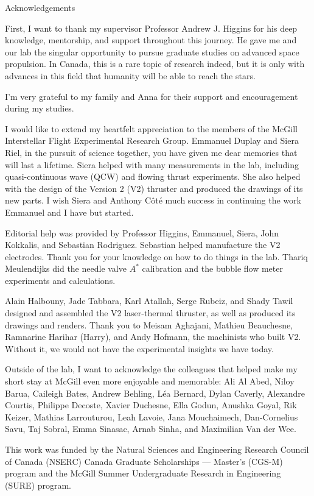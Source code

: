 \begin{plainchp}{Acknowledgements}
    
    First, I want to thank my supervisor Professor Andrew J. Higgins for his deep knowledge, mentorship, and support throughout this journey. He gave me and our lab the singular opportunity to pursue graduate studies on advanced space propulsion. In Canada, this is a rare topic of research indeed, but it is only with advances in this field that humanity will be able to reach the stars.

    I'm very grateful to my family and Anna for their support and encouragement during my studies.

    I would like to extend my heartfelt appreciation to the members of the McGill Interstellar Flight Experimental Research Group. Emmanuel Duplay and Siera Riel, in the pursuit of science together, you have given me dear memories that will last a lifetime. Siera helped with many measurements in the lab, including quasi-continuous wave (QCW) and flowing thrust experiments. She also helped with the design of the Version 2 (V2) thruster and produced the drawings of its new parts. I wish Siera and Anthony Côté much success in continuing the work Emmanuel and I have but started.

    Editorial help was provided by Professor Higgins, Emmanuel, Siera, John Kokkalis, and Sebastian Rodriguez. Sebastian helped manufacture the V2 electrodes. Thank you for your knowledge on how to do things in the lab. Thariq Meulendijks did the needle valve $A^*$ calibration and the bubble flow meter experiments and calculations.

    Alain Halbouny, Jade Tabbara, Karl Atallah, Serge Rubeiz, and Shady Tawil designed and assembled the V2 laser-thermal thruster, as well as produced its drawings and renders. Thank you to Meisam Aghajani, Mathieu Beauchesne, Ramnarine Harihar (Harry), and Andy Hofmann, the machinists who built V2. Without it, we would not have the experimental insights we have today.

    Outside of the lab, I want to acknowledge the colleagues that helped make my short stay at McGill even more enjoyable and memorable: Ali Al Abed, Niloy Barua, Caileigh Bates, Andrew Behling, Léa Bernard, Dylan Caverly, Alexandre Courtis, Philippe Decoste, Xavier Duchesne, Ella Godun, Anushka Goyal, Rik Keizer, Mathias Larrouturou, Leah Lavoie, Jana Mouchaimech, Dan-Cornelius Savu, Taj Sobral, Emma Sinasac, Arnab Sinha, and Maximilian Van der Wee.

    This work was funded by the Natural Sciences and Engineering Research Council of Canada (NSERC) Canada Graduate Scholarships — Master's (CGS-M) program and the McGill Summer Undergraduate Research in Engineering (SURE) program.

\end{plainchp}